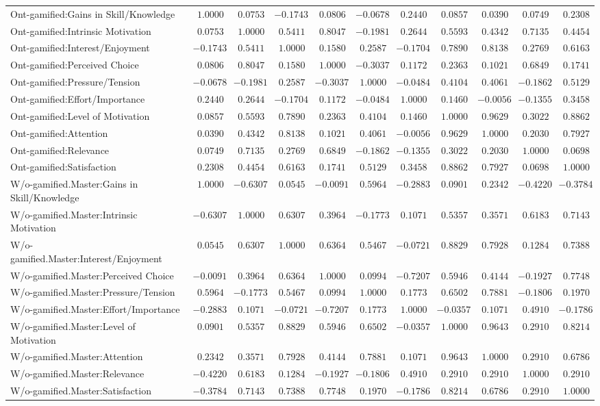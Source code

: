 \begin{landscape}
{\begin{longtable}{lrrrrrrrrrr}
Ont-gamified:Gains in Skill/Knowledge&$ 1.0000$&$ 0.0753$&$-0.1743$&$ 0.0806$&$-0.0678$&$ 0.2440$&$0.0857$&$ 0.0390$&$ 0.0749$&$0.2308$\tabularnewline
Ont-gamified:Intrinsic Motivation&$ 0.0753$&$ 1.0000$&$ 0.5411$&$ 0.8047$&$-0.1981$&$ 0.2644$&$0.5593$&$ 0.4342$&$ 0.7135$&$0.4454$\tabularnewline
Ont-gamified:Interest/Enjoyment&$-0.1743$&$ 0.5411$&$ 1.0000$&$ 0.1580$&$ 0.2587$&$-0.1704$&$0.7890$&$ 0.8138$&$ 0.2769$&$0.6163$\tabularnewline
Ont-gamified:Perceived Choice&$ 0.0806$&$ 0.8047$&$ 0.1580$&$ 1.0000$&$-0.3037$&$ 0.1172$&$0.2363$&$ 0.1021$&$ 0.6849$&$0.1741$\tabularnewline
Ont-gamified:Pressure/Tension&$-0.0678$&$-0.1981$&$ 0.2587$&$-0.3037$&$ 1.0000$&$-0.0484$&$0.4104$&$ 0.4061$&$-0.1862$&$0.5129$\tabularnewline
Ont-gamified:Effort/Importance&$ 0.2440$&$ 0.2644$&$-0.1704$&$ 0.1172$&$-0.0484$&$ 1.0000$&$0.1460$&$-0.0056$&$-0.1355$&$0.3458$\tabularnewline
Ont-gamified:Level of Motivation&$ 0.0857$&$ 0.5593$&$ 0.7890$&$ 0.2363$&$ 0.4104$&$ 0.1460$&$1.0000$&$ 0.9629$&$ 0.3022$&$0.8862$\tabularnewline
Ont-gamified:Attention&$ 0.0390$&$ 0.4342$&$ 0.8138$&$ 0.1021$&$ 0.4061$&$-0.0056$&$0.9629$&$ 1.0000$&$ 0.2030$&$0.7927$\tabularnewline
Ont-gamified:Relevance&$ 0.0749$&$ 0.7135$&$ 0.2769$&$ 0.6849$&$-0.1862$&$-0.1355$&$0.3022$&$ 0.2030$&$ 1.0000$&$0.0698$\tabularnewline
Ont-gamified:Satisfaction&$ 0.2308$&$ 0.4454$&$ 0.6163$&$ 0.1741$&$ 0.5129$&$ 0.3458$&$0.8862$&$ 0.7927$&$ 0.0698$&$1.0000$\tabularnewline
\hline


W/o-gamified.Master:Gains in Skill/Knowledge&$ 1.0000$&$-0.6307$&$ 0.0545$&$-0.0091$&$ 0.5964$&$-0.2883$&$ 0.0901$&$0.2342$&$-0.4220$&$-0.3784$\tabularnewline
W/o-gamified.Master:Intrinsic Motivation&$-0.6307$&$ 1.0000$&$ 0.6307$&$ 0.3964$&$-0.1773$&$ 0.1071$&$ 0.5357$&$0.3571$&$ 0.6183$&$ 0.7143$\tabularnewline
W/o-gamified.Master:Interest/Enjoyment&$ 0.0545$&$ 0.6307$&$ 1.0000$&$ 0.6364$&$ 0.5467$&$-0.0721$&$ 0.8829$&$0.7928$&$ 0.1284$&$ 0.7388$\tabularnewline
W/o-gamified.Master:Perceived Choice&$-0.0091$&$ 0.3964$&$ 0.6364$&$ 1.0000$&$ 0.0994$&$-0.7207$&$ 0.5946$&$0.4144$&$-0.1927$&$ 0.7748$\tabularnewline
W/o-gamified.Master:Pressure/Tension&$ 0.5964$&$-0.1773$&$ 0.5467$&$ 0.0994$&$ 1.0000$&$ 0.1773$&$ 0.6502$&$0.7881$&$-0.1806$&$ 0.1970$\tabularnewline
W/o-gamified.Master:Effort/Importance&$-0.2883$&$ 0.1071$&$-0.0721$&$-0.7207$&$ 0.1773$&$ 1.0000$&$-0.0357$&$0.1071$&$ 0.4910$&$-0.1786$\tabularnewline
W/o-gamified.Master:Level of Motivation&$ 0.0901$&$ 0.5357$&$ 0.8829$&$ 0.5946$&$ 0.6502$&$-0.0357$&$ 1.0000$&$0.9643$&$ 0.2910$&$ 0.8214$\tabularnewline
W/o-gamified.Master:Attention&$ 0.2342$&$ 0.3571$&$ 0.7928$&$ 0.4144$&$ 0.7881$&$ 0.1071$&$ 0.9643$&$1.0000$&$ 0.2910$&$ 0.6786$\tabularnewline
W/o-gamified.Master:Relevance&$-0.4220$&$ 0.6183$&$ 0.1284$&$-0.1927$&$-0.1806$&$ 0.4910$&$ 0.2910$&$0.2910$&$ 1.0000$&$ 0.2910$\tabularnewline
W/o-gamified.Master:Satisfaction&$-0.3784$&$ 0.7143$&$ 0.7388$&$ 0.7748$&$ 0.1970$&$-0.1786$&$ 0.8214$&$0.6786$&$ 0.2910$&$ 1.0000$\tabularnewline
\hline



\end{longtable}}
\end{landscape}
